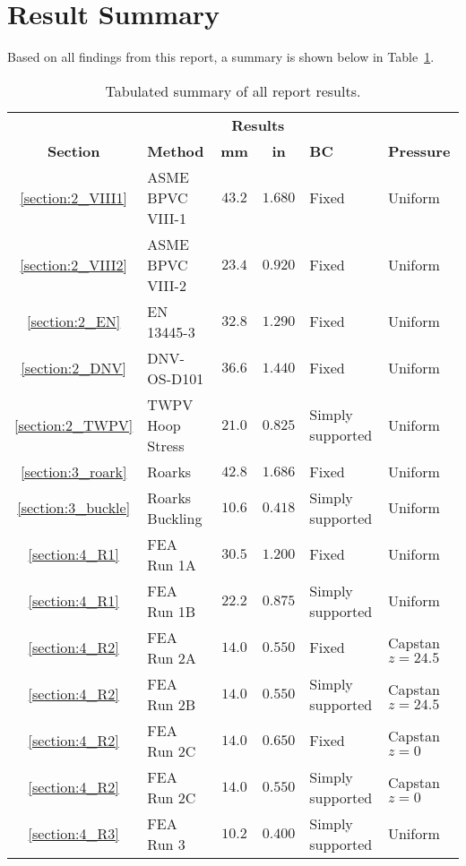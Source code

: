 \section{Result Summary}

Based on all findings from this report, a summary is shown below in Table~\ref{table:5_sum}.

\begin{table}[H]
  \centering
  \caption{Tabulated summary of all report results.}
    \begin{tabular}{clccll}
          &       & \multicolumn{2}{c}{\textbf{Results}} &       &  \\
    \textbf{Section} & \textbf{Method} & \textbf{mm} & \textbf{in} & \textbf{BC} & \textbf{Pressure } \\
    \midrule
          \ref{section:2_VIII1}& ASME BPVC VIII-1 & $43.2$ & $1.680$ & Fixed & Uniform \\
          \ref{section:2_VIII2}& ASME BPVC VIII-2 & $23.4$ & $0.920$ & Fixed & Uniform \\
          \ref{section:2_EN}& EN 13445-3 & $32.8$ & $1.290$ & Fixed & Uniform \\
          \ref{section:2_DNV}& DNV-OS-D101 & $36.6$ & $1.440$ & Fixed & Uniform \\
          \ref{section:2_TWPV}& TWPV Hoop Stress & $21.0$ & $0.825$ & Simply supported & Uniform \\
          \ref{section:3_roark}& Roarks & $42.8$ & $1.686$ & Fixed & Uniform \\
          \ref{section:3_buckle}& Roarks Buckling & $10.6$ & $0.418$ & Simply supported & Uniform \\
          \ref{section:4_R1}& FEA Run 1A & $30.5$ & $1.200$ & Fixed & Uniform \\
          \ref{section:4_R1}& FEA Run 1B & $22.2$ & $0.875$ & Simply supported & Uniform \\
          \ref{section:4_R2}& FEA Run 2A & $14.0$ & $0.550$ & Fixed & Capstan $z=24.5$ \\
          \ref{section:4_R2}& FEA Run 2B & $14.0$ & $0.550$ & Simply supported & Capstan $z=24.5$\\
          \ref{section:4_R2}& FEA Run 2C & $14.0$ & $0.650$ & Fixed & Capstan $z=0$ \\
          \ref{section:4_R2}& FEA Run 2C & $14.0$ & $0.550$ & Simply supported & Capstan $z=0$  \\
          \ref{section:4_R3}& FEA Run 3 & $10.2$ & $0.400$ & Simply supported & Uniform \\
    \end{tabular}
  \label{table:5_sum}
\end{table}%

